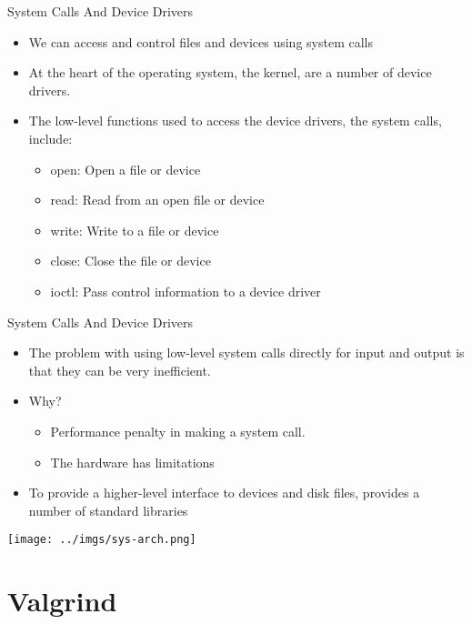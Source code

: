 \documentclass{beamer}
\begin{document}
\begin{frame}{System Calls And Device Drivers}
\begin{itemize}
\item We can access and control files and devices using system calls
\item At the heart of the operating system, the kernel, are a number of device drivers.
\item The low-level functions used to access the device drivers, the system calls, include:
\begin{itemize}
\item open: Open a file or device
\item read: Read from an open file or device
\item write: Write to a file or device
\item close: Close the file or device
\item ioctl: Pass control information to a device driver
\end{itemize}
\end{itemize}
\end{frame}

\begin{frame}{System Calls And Device Drivers}
\begin{itemize}
\item The problem with using low-level system calls directly for input and output is that they can be very inefficient.
\item Why?
\begin{itemize}
\item Performance penalty in making a system call.
\item The hardware has limitations
\end{itemize}
\item To provide a higher-level interface to devices and disk files, provides a number of standard libraries
\end{itemize}
\end{frame}

\begin{frame}{}
\texttt{[image: ../imgs/sys-arch.png]}
\end{frame}

\section{Valgrind}
\subsection{}
\end{document}
